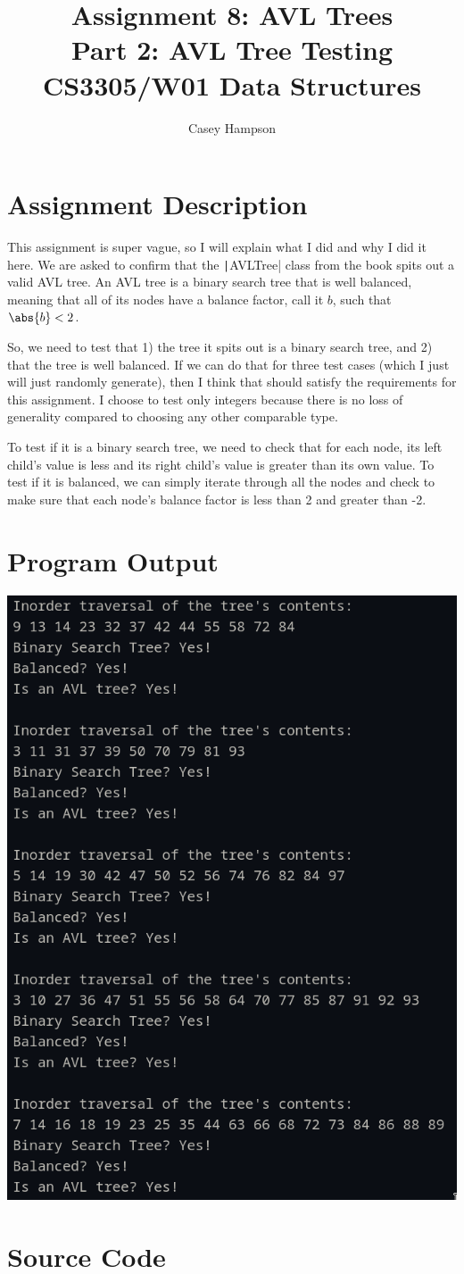\documentclass[titlepage]{article}
\title{Assignment 8: AVL Trees \\[5pt] Part 2: AVL Tree Testing \\[8pt] CS3305/W01 Data Structures}
\author{Casey Hampson}
\begin{document}
\maketitle

\section*{Assignment Description}
This assignment is super vague, so I will explain what I did and why I did it here. We are asked to confirm that the \texttt|AVLTree| class from the book spits out a valid AVL tree. An AVL tree is a binary search tree that is well balanced, meaning that all of its nodes have a balance factor, call it $b$, such that $\abs{b} < 2$.

So, we need to test that 1) the tree it spits out is a binary search tree, and 2) that the tree is well balanced. If we can do that for three test cases (which I just will just randomly generate), then I think that should satisfy the requirements for this assignment. I choose to test only integers because there is no loss of generality compared to choosing any other comparable type.

To test if it is a binary search tree, we need to check that for each node, its left child's value is less and its right child's value is greater than its own value. To test if it is balanced, we can simply iterate through all the nodes and check to make sure that each node's balance factor is less than 2 and greater than -2.


\section*{Program Output}
\begin{center}
\includegraphics[width=0.7\linewidth]{./res/1.png}
\end{center}


\pagebreak
\section*{Source Code}
\inputminted{java}{./P2.java}
\end{document}
